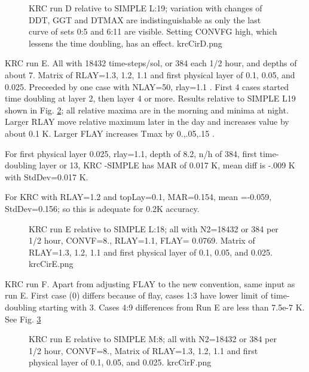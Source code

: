 \documentclass{article}
\begin{document}
\begin{figure}[!ht] 
\caption[KRC flay=.1 tests]{KRC run D relative to SIMPLE L:19; variation with changes of DDT, GGT and DTMAX are indistinguishable as only the last curve of sets 0:5 and 6:11 are visible. Setting CONVFG high, which lessens the time doubling, has an effect.
\label{krcCirD} krcCirD.png }
\end{figure} 

\clearpage

KRC run E.  All with 18432 time-steps/sol, or 384 each 1/2 hour, and depths of
about 7. Matrix of RLAY=1.3, 1.2, 1.1 and first physical layer of 0.1, 0.05, and
0.025.  Preceeded by one case with NLAY=50, rlay=1.1 . First 4 cases started
time doubling at layer 2, then layer 4 or more. Results relative to SIMPLE L19
shown in Fig. \ref{krcCirE}; all relative maxima are in the morning and
minima at night.  Larger RLAY move relative maximum later in the day and
increases value by about 0.1 K. Larger FLAY increases Tmax by 0.,.05,.15 .

For first physical layer 0.025, rlay=1.1, depth of 8.2, n/h of 384, first
time-doubling layer or 13, KRC -SIMPLE has MAR of 0.017 K, mean diff is -.009 K
with StdDev=0.017 K.

For KRC with RLAY=1.2 and topLay=0.1, MAR=0.154, mean =-0.059, StdDev=0.156; so
this is adequate for 0.2K accuracy.

\begin{figure}[!ht] 
\caption[KRC flay=.1 tests]{KRC run E relative to SIMPLE L:18; all with N2=18432 or 384 per 1/2 hour, CONVF=8., RLAY=1.1, FLAY= 0.0769. Matrix of RLAY=1.3, 1.2, 1.1 and first physical layer of 0.1, 0.05, and 0.025. 
\label{krcCirE} krcCirE.png }
\end{figure} 

KRC run F. Apart from adjusting FLAY to the new convention, same input as run E.  First case (0) differs because of flay, cases 1:3  have lower limit of time-doubling starting with 3.  
Cases 4:9 differences from Run E are less than 7.5e-7 K. See Fig. \ref{krcCirF}

\begin{figure}[!ht] 
\caption[KRC flay/rlay tests]{KRC run E relative to SIMPLE M:8; all with N2=18432 or 384 per 1/2 hour, CONVF=8., Matrix of RLAY=1.3, 1.2, 1.1 and first physical layer of 0.1, 0.05, and 0.025. 
\label{krcCirF} krcCirF.png }
\end{figure} 
\end{document}
